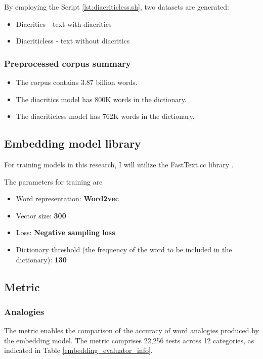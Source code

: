 \documentclass{article}
\begin{document}
By employing the Script \ref{lst:diacriticless.sh}, two datasets are generated:

\begin{itemize}
\item Diacritics - text with diacritics
\item Diacriticless - text without diacritics
\end{itemize}



\subsubsection{Preprocessed corpus summary}
\begin{itemize}
  \item The corpus contains 3.87 billion words.
  \item The diacritics model has 800K words in the dictionary.
  \item The diacriticless model has 762K words in the dictionary.
\end{itemize}



\subsection{Embedding model library}
For training models in this research, I will utilize the FastText.cc library  \cite{bojanowski2016enriching}.

The parameters for training are
\begin{itemize}
  \item Word representation: \textbf{Word2vec}
  \item Vector size: \textbf{300}
  \item Loss: \textbf{Negative sampling loss}
  \item Dictionary threshold (the frequency of the word to be included in the dictionary): \textbf{130}
\end{itemize}
  

\subsection{Metric}


\subsubsection[]{Analogies \cite{embedding_evaluator_paper}}

The metric enables the comparison of the accuracy of word analogies produced by the embedding model.
The metric comprises 22,256 tests across 12 categories, as indicated in Table \ref{embedding_evaluator_info}.
\end{document}
